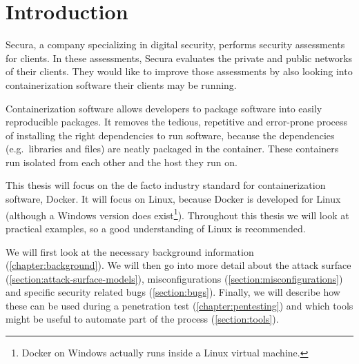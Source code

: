 \chapter{Introduction}
Secura, a company specializing in digital security, performs security assessments for clients. In these assessments, Secura evaluates the private and public networks of their clients. They would like to improve those assessments by also looking into containerization software their clients may be running.

\medskip

Containerization software allows developers to package software into easily reproducible packages. It removes the tedious, repetitive and error-prone process of installing the right dependencies to run software, because the dependencies (e.g.\ libraries and files) are neatly packaged in the container. These containers run isolated from each other and the host they run on.

\medskip

This thesis will focus on the de facto industry standard for containerization software, Docker. It will focus on Linux, because Docker is developed for Linux (although a Windows version does exist\footnote{Docker on Windows actually runs inside a Linux virtual machine.}). Throughout this thesis we will look at practical examples, so a good understanding of Linux is recommended.

\medskip

We will first look at the necessary background information (\autoref{chapter:background}). We will then go into more detail about the attack surface (\autoref{section:attack-surface-models}), misconfigurations (\autoref{section:misconfigurations}) and specific security related bugs (\autoref{section:bugs}). Finally, we will describe how these can be used during a penetration test (\autoref{chapter:pentesting}) and which tools might be useful to automate part of the process (\autoref{section:tools}).
